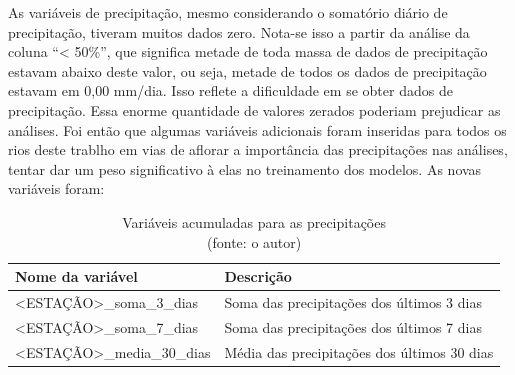 As variáveis de precipitação, mesmo considerando o somatório diário de precipitação, tiveram muitos dados zero. Nota-se isso a partir da análise da coluna ``< 50\%'', que significa metade de toda massa de dados de precipitação estavam abaixo deste valor, ou seja, metade de todos os dados de precipitação estavam em 0,00 mm/dia. Isso reflete a dificuldade em se obter dados de precipitação. Essa enorme quantidade de valores zerados poderiam prejudicar as análises. Foi então que algumas variáveis adicionais foram inseridas para todos os rios deste trablho em vias de aflorar a importância das precipitações nas análises, tentar dar um peso significativo à elas no treinamento dos modelos. As novas variáveis foram:

\begin{table}[!h]
	\centering \small
	\caption{Variáveis acumuladas para as precipitações \\(fonte: o autor)}
	\begin{tabular}{|l|l|} \hline 
		\textbf{Nome da variável}    & \textbf{Descrição}                          \\\hline
		<ESTAÇÃO>\_soma\_3\_dias     & Soma das precipitações dos últimos 3 dias   \\\hline
		<ESTAÇÃO>\_soma\_7\_dias     & Soma das precipitações dos últimos 7 dias   \\\hline
		<ESTAÇÃO>\_media\_30\_dias   & Média das precipitações dos últimos 30 dias \\\hline
	\end{tabular}
	\label{tab:variaveis_acumuladas}
\end{table}

